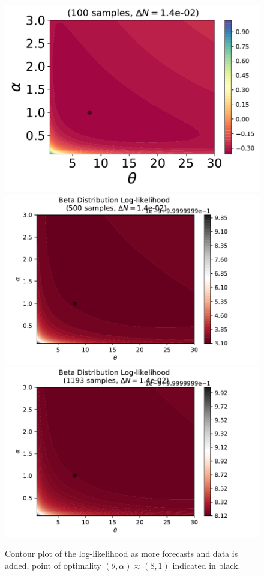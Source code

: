\documentclass[10pt,twocolumn,letterpaper]{article}
\begin{document}
 
 \begin{figure}[t]
\begin{center}
   \includegraphics[width=0.5\linewidth]{ISO_100_samples_dN=14e-02.pdf}
   \includegraphics[width=0.5\linewidth]{ISO_500_samples_dN=14e-02.pdf}
   \includegraphics[width=0.5\linewidth]{ISO_1193_samples_dN=14e-02.pdf}
\end{center}
   \caption{Contour plot of the log-likelihood as more forecasts and data is added, point of optimality $(\theta, \alpha)\approx (8,1)$ indicated in black.}
\label{contour}
\end{figure}
\end{document}
